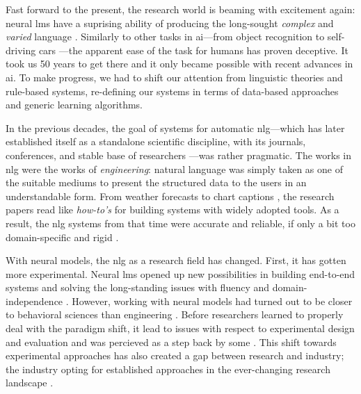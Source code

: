 \documentclass[12pt,notitlepage,a4paper,openright]{report}
\begin{document}
Fast forward to the present, the research world is beaming with excitement again: neural \acp{lm} have a suprising ability of producing the long-sought \textit{complex} and \textit{varied} language \cite{radford2019language,brown2020language}. Similarly to other tasks in \ac{ai}---from object recognition \cite{papert1966summer} to self-driving cars \cite{autonomouscars}---the apparent ease of the task for humans has proven deceptive. It took us 50 years to get there and it only became possible with recent advances in \ac{ai}. To make progress, we had to shift our attention from linguistic theories and rule-based systems, re-defining our systems in terms of data-based approaches and generic learning algorithms.

In the previous decades, the goal of systems for automatic \ac{nlg}---which has later established itself as a standalone scientific discipline, with its journals, conferences, and stable base of researchers \cite{ACLanthologySIGGEN}---was rather pragmatic.
The works in \ac{nlg} were the works of \textit{engineering}: natural language was simply taken as one of the suitable mediums to present the structured data to the users in an understandable form. From weather forecasts \cite{belzAutomaticGenerationWeather2008} to chart captions \cite{demirSummarizingInformationGraphics2012}, the research papers read like \textit{how-to's} for building systems with widely adopted tools. As a result, the \ac{nlg} systems from that time were accurate and reliable, if only a bit too domain-specific and rigid \cite{reiterBuildingAppliedNatural1997,gattSurveyStateArt2018}.


With neural models, the  \ac{nlg} as a research field has changed. First, it has gotten more experimental. Neural \acp{lm} opened up new possibilities in building end-to-end systems and solving the long-standing issues with fluency and domain-independence \cite{ferreiraNeuralDatatotextGeneration2019,dusekEvaluatingStateoftheartEndtoEnd2020,sharmaInnovationsNeuralDatatotext2022}. However, working with neural models had turned out to be closer to behavioral sciences than engineering \cite{holtzmanGenerativeModelsComplex2023}. Before researchers learned to properly deal with the paradigm shift, it lead to issues with respect to experimental design and evaluation \cite{gehrmannRepairingCrackedFoundation2022} and was percieved as a step back by some \cite{reiter2020academic}. This shift towards experimental approaches has also created a gap between research and industry; the industry opting for established approaches in the ever-changing research landscape \cite{daleNaturalLanguageGeneration2020,daleNavigatingTextGeneration2023}.
\end{document}
